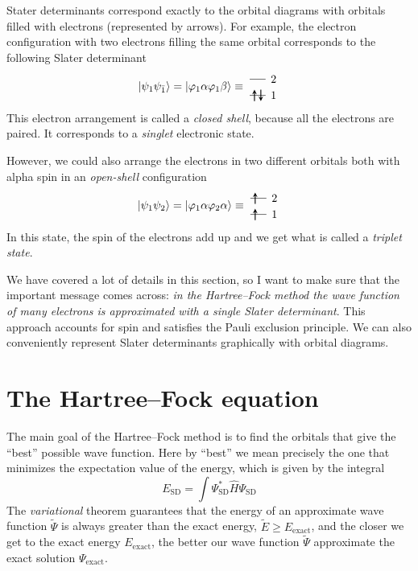 \documentclass[../Main/chem371-notes.tex]{subfiles}
\begin{document}
Stater determinants correspond exactly to the orbital diagrams with orbitals filled with electrons (represented by arrows).
For example, the electron configuration with two electrons filling the same orbital corresponds to the following Slater determinant\begin{equation}
\ket{\psi_1 \psi_{\bar{1}}} = 
\ket{\varphi_1 \alpha \varphi_1 \beta }
\equiv \;
\begin{tikzpicture}[baseline={([yshift=-.5ex]current bounding box.center)},]
    \draw (0,0.5) -- (0.5,0.5);
    \draw[thick,->,>=stealth] (0.15,0.325) -- (0.15,0.675);    
    \draw[thick,<-,>=stealth] (0.35,0.325) -- (0.35,0.675);    
    \draw (0,1.0) -- (0.5,1.0);
    \draw (0.75,0.5) node{1};
    \draw (0.75,1.0) node{2};
\end{tikzpicture}
\end{equation}
This electron arrangement is called a \emph{closed shell}, because all the electrons are paired. It corresponds to a \emph{singlet} electronic state.

However, we could also arrange the electrons in two different orbitals both with alpha spin in an \emph{open-shell} configuration
\begin{equation}
\ket{\psi_1 \psi_2}= 
\ket{\varphi_1 \alpha \varphi_2\alpha}
\equiv \;
\begin{tikzpicture}[baseline={([yshift=-.5ex]current bounding box.center)},]
    \draw (0,0.5) -- (0.5,0.5);
    \draw[thick,->,>=stealth] (0.15,0.325) -- (0.15,0.675);    
    \draw[thick,->,>=stealth] (0.15,0.825) -- (0.15,1.175);        
    \draw (0,1.0) -- (0.5,1.0);
    \draw (0.75,0.5) node{1};
    \draw (0.75,1.0) node{2};
\end{tikzpicture}
\end{equation}
In this state, the spin of the electrons add up and we get what is called a \emph{triplet state}.

We have covered a lot of details in this section, so I want to make sure that the important message comes across: \emph{in the Hartree--Fock method the wave function of many electrons is approximated with a single Slater determinant}.
This approach accounts for spin and satisfies the Pauli exclusion principle.
We can also conveniently represent Slater determinants graphically with orbital diagrams.

\section{The Hartree--Fock equation}
The main goal of the Hartree--Fock method is to find the orbitals that give the ``best'' possible wave function.
Here by ``best'' we mean precisely the one that minimizes the expectation value of the energy, which is given by the integral
\begin{equation}
E_\mathrm{SD} = \int \Psi_{\mathrm{SD}}^* \hat{H}\Psi_{\mathrm{SD}}
\end{equation}
The \emph{variational} theorem guarantees that the energy of an approximate wave function $\tilde{\Psi}$ is always greater than the exact energy, $\tilde{E} \geq E_\mathrm{exact}$, and the closer we get to the exact energy $E_\mathrm{exact}$, the better our wave function $\tilde{\Psi}$ approximate the exact solution $\Psi_\mathrm{exact}$.
\end{document}
